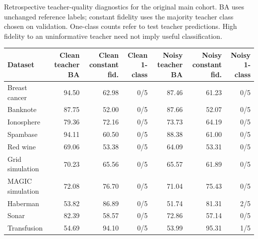 \begin{kbtable}
\centering
\caption{Retrospective teacher-quality diagnostics for the original main cohort. BA uses unchanged reference labels; constant fidelity uses the majority teacher class chosen on validation. One-class counts refer to test teacher predictions. High fidelity to an uninformative teacher need not imply useful classification.}
\label{tab:teacher_quality}
\small
\begin{adjustbox}{max width=\linewidth}
\begin{tabular}{lrrrrrr}
\toprule
Dataset & Clean teacher BA & Clean constant fid. & Clean 1-class & Noisy teacher BA & Noisy constant fid. & Noisy 1-class \\
\midrule
Breast cancer & 94.50 & 62.98 & 0/5 & 87.46 & 61.23 & 0/5 \\
Banknote & 87.75 & 52.00 & 0/5 & 87.66 & 52.07 & 0/5 \\
Ionosphere & 79.36 & 72.16 & 0/5 & 73.73 & 64.19 & 0/5 \\
Spambase & 94.11 & 60.50 & 0/5 & 88.38 & 61.00 & 0/5 \\
Red wine & 69.06 & 53.38 & 0/5 & 64.09 & 53.31 & 0/5 \\
Grid simulation & 70.23 & 65.56 & 0/5 & 65.57 & 61.89 & 0/5 \\
MAGIC simulation & 72.08 & 76.70 & 0/5 & 71.04 & 75.43 & 0/5 \\
Haberman & 53.82 & 86.89 & 0/5 & 51.74 & 81.31 & 2/5 \\
Sonar & 82.39 & 58.57 & 0/5 & 72.86 & 57.14 & 0/5 \\
Transfusion & 54.69 & 94.10 & 0/5 & 53.99 & 95.31 & 1/5 \\
\bottomrule
\end{tabular}
\end{adjustbox}
\end{kbtable}
